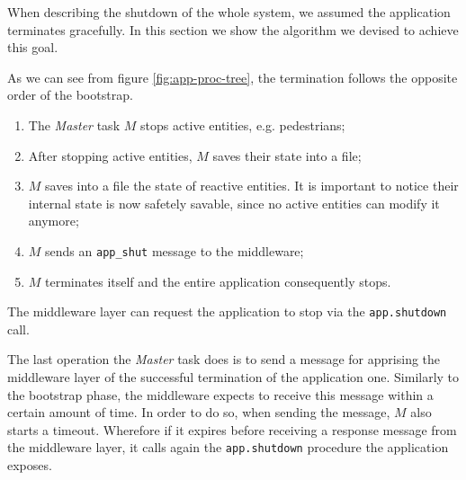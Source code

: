 When describing the shutdown of the whole system, we assumed the application
terminates gracefully.
In this section we show the algorithm we devised to achieve this goal.

As we can see from figure \ref{fig:app-proc-tree}, the termination follows the
opposite order of the bootstrap.

\begin{enumerate}
  \item The \textit{Master} task $M$ stops active entities, e.g. pedestrians;
  \item After stopping active entities, $M$ saves their state into a file;
  \item $M$ saves into a file the state of reactive entities.
  It is important to notice their internal state is now safetely savable,
  since no active entities can modify it anymore;
  \item $M$ sends an \texttt{app\_shut} message to the middleware;
  \item $M$ terminates itself and the entire application consequently stops.
\end{enumerate}

The middleware layer can request the application to stop via the
\texttt{app.shutdown} call.

The last operation the \textit{Master} task does is to send a message for apprising
the middleware layer of the successful termination of the application one.
Similarly to the bootstrap phase, the middleware expects to receive this
message within a certain amount of time.
In order to do so, when sending the message, $M$ also starts a timeout.
Wherefore if it expires before receiving a response message from the middleware layer,
it calls again the \texttt{app.shutdown} procedure the application exposes.
